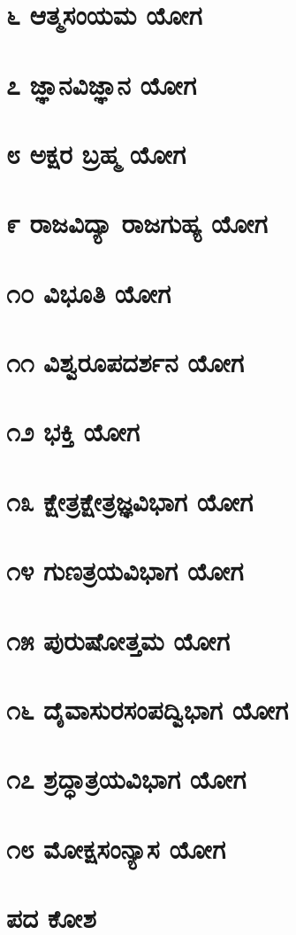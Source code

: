 \documentclass[12pt,twoside,openright,a5paper]{book}
\begin{document}
\chapter{\kanfont ೬ ಆತ್ಮಸಂಯಮ ಯೋಗ}
\chapter{\kanfont ೭ ಜ್ಞಾನವಿಜ್ಞಾನ ಯೋಗ}
\chapter{\kanfont ೮ ಅಕ್ಷರ ಬ್ರಹ್ಮ ಯೋಗ}
\chapter{\kanfont ೯ ರಾಜವಿದ್ಯಾ ರಾಜಗುಹ್ಯ ಯೋಗ}
\chapter{\kanfont ೧೦ ವಿಭೂತಿ ಯೋಗ}
\chapter{\kanfont ೧೧ ವಿಶ್ವರೂಪದರ್ಶನ ಯೋಗ}
\chapter{\kanfont ೧೨ ಭಕ್ತಿ ಯೋಗ}
\chapter{\kanfont ೧೩ ಕ್ಷೇತ್ರಕ್ಷೇತ್ರಜ್ಞವಿಭಾಗ ಯೋಗ}
\chapter{\kanfont ೧೪ ಗುಣತ್ರಯವಿಭಾಗ ಯೋಗ}
\chapter{\kanfont ೧೫ ಪುರುಷೋತ್ತಮ ಯೋಗ}
\chapter{\kanfont ೧೬ ದೈವಾಸುರಸಂಪದ್ವಿಭಾಗ ಯೋಗ}
\chapter{\kanfont ೧೭ ಶ್ರದ್ಧಾತ್ರಯವಿಭಾಗ ಯೋಗ}
\chapter{\kanfont ೧೮ ಮೋಕ್ಷಸಂನ್ಯಾಸ ಯೋಗ}
\chapter{\kanfont ಪದ ಕೋಶ}


\printindex
\end{document}
